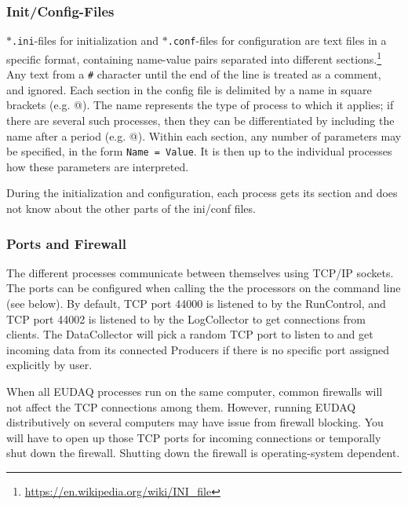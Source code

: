 \subsubsection{Init/Config-Files}\label{sec:ConfigFiles}
\texttt{$\ast$.ini}-files for initialization and \texttt{$\ast$.conf}-files for configuration
are text files in a specific format, containing name-value pairs separated into different sections.\footnote{\url{https://en.wikipedia.org/wiki/INI\_file}}
Any text from a \texttt{\#} character until the end of the line is treated as a comment, and
ignored.  
Each section in the config file is delimited by a name in square brackets
(e.g. \verb@[RunControl]@).  
The name represents the type of process to which it applies; if there
are several such processes, then they can be differentiated by including the name after a period
(e.g. @).  
Within each section, any number of parameters may be specified,
in the form \mbox{\texttt{Name = Value}}.  
It is then up to the individual processes how these parameters are interpreted.

During the initialization and configuration, each process gets its section and does not know about the other parts of the ini/conf files.


\subsubsection{Ports and Firewall}
The different processes communicate between themselves using TCP/IP sockets. The ports can be configured when calling the the processors on the command line (see below). By default, TCP port 44000 is listened to by the RunControl, and TCP port 44002 is listened to by the LogCollector to get connections from clients. The DataCollector will pick a random TCP port to listen to and get incoming data from its connected Producers if there is no specific port assigned explicitly by user.

When all EUDAQ processes run on the same computer, common firewalls will not affect the TCP connections among them. However, running EUDAQ distributively on several computers may have issue from firewall blocking. You will have to open up those TCP ports for incoming connections or temporally shut down the firewall. Shutting down the firewall is operating-system dependent.\\

